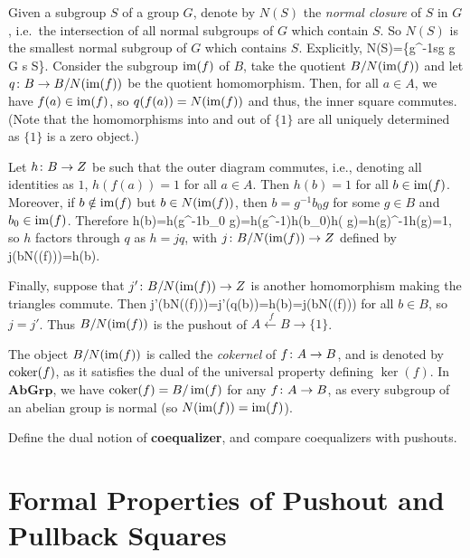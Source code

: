 \bs
Given a subgroup $S$ of a group $G$, denote by $N(S)$ the \emph{normal closure} of $S$ in $G$, i.e.\ the intersection of all normal subgroups of $G$ which contain $S$. So $N(S)$ is the smallest normal subgroup of $G$ which contains $S$. Explicitly,
\bse
N(S)=\{g^{-1}sg \mid g \in G  s \in S\}.
\ese
Consider the subgroup $\operatorname{im} (f)$ of $B$, take the quotient $B/N(\operatorname{im}(f))$ and let $q\colon B \to B/N(\operatorname{im}(f))$ be the quotient homomorphism. Then, for all $a\in A$, we have $f(a)\in \operatorname{im}(f)$, so $q(f(a))=N(\operatorname{im}(f))$ and thus, the inner square commutes. (Note that the homomorphisms into and out of $\{1\}$ are all uniquely determined as $\{1\}$ is a zero object.)
\bse
{}
\ese
Let $h\colon B\to Z$ be such that the outer diagram commutes, i.e., denoting all identities as $1$, $h(f(a))=1$ for all $a\in A$. Then $h(b)=1$ for all $b\in \operatorname{im}(f)$. Moreover, if $b\notin \operatorname{im}(f)$ but $b\in N(\operatorname{im}(f))$, then $b=g^{-1}b_0 g$ for some $g\in B$ and $b_0\in \operatorname{im}(f)$. Therefore
\bse
h(b)=h(g^{-1}b_0 g)=h(g^{-1})h(b_0)h( g)=h(g)^{-1}h(g)=1,
\ese
so $h$ factors through $q$ as $h=jq$, with $j\colon B/N(\operatorname{im}(f))\to Z$ defined by
\bse
j(bN(\im(f)))=h(b).
\ese

Finally, suppose that $j'\colon B/N(\operatorname{im}(f))\to Z$ is another homomorphism making the triangles commute. Then
\bse
j'(bN(\im(f)))=j'(q(b))=h(b)=j(bN(\im(f)))
\ese
for all $b\in B$, so $j=j'$. Thus $B/N(\operatorname{im}(f))$ is the pushout of $A\xleftarrow{\ f} B\to\{1\}$. 

The object $B/N(\operatorname{im}(f))$ is called the \emph{cokernel} of $f\colon A\to B$, and is denoted by $\operatorname{coker}(f)$, as it satisfies the dual of the universal property defining $\ker(f)$. In $\mathbf{AbGrp}$, we have $\operatorname{coker}(f)=B/\operatorname{im}(f)$ for any $f\colon A\to B$, as every subgroup of an abelian group is normal (so $N(\operatorname{im}(f))=\operatorname{im}(f)$).
\es

\bp
Define the dual notion of \textbf{coequalizer}, and compare coequalizers with pushouts.
\ep

\bs
\es

\section{Formal Properties of Pushout and Pullback Squares}

